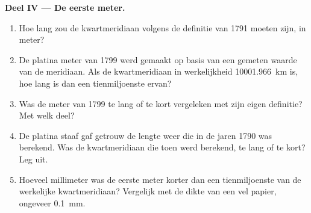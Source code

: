 \begin{problem}
\medskip
\noindent\textbf{Deel IV --- De eerste meter.}
\begin{enumerate}[resume]
  \item Hoe lang zou de kwartmeridiaan volgens de definitie van 1791 moeten
        zijn, in meter?
  \item De platina meter van 1799 werd gemaakt op basis van een gemeten waarde
        van de meridiaan. Als de kwartmeridiaan in werkelijkheid
        \qty{10001.966}{km} is, hoe lang is dan een tienmiljoenste ervan?
  \item Was de meter van 1799 te lang of te kort vergeleken met zijn eigen
        definitie? Met welk deel?
  \item De platina staaf gaf getrouw de lengte weer die in de jaren 1790 was
        berekend. Was de kwartmeridiaan die toen werd berekend, te lang of te
        kort? Leg uit.
  \item Hoeveel millimeter was de eerste meter korter dan een tienmiljoenste
        van de werkelijke kwartmeridiaan? Vergelijk met de dikte van een vel
        papier, ongeveer \qty{0.1}{mm}.
\end{enumerate}
\end{problem}

